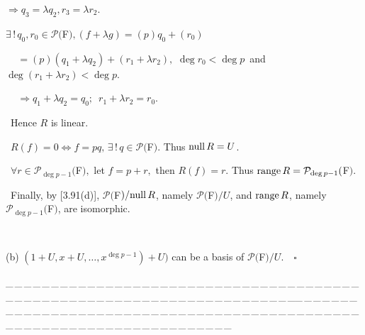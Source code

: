 \documentclass[a4paper, 11pt, UTF8]{article}
\def\range{\textup{range}\,}
\def\null{\textup{null\,}}
\def\Po{\mathcal{P}}
\begin{document}
\begin{large}
$\Rightarrow q_3=\lambda q_2,r_3=\lambda r_2.$\par\qquad\qquad\qquad\quad\quad
$\exists\,!\,q_0,r_0\in\Po(${\timesbf F}$),(f+\lambda g)=(p)q_0+(r_0)$\par\qquad\qquad\,\,\,\,\,\qquad\qquad\qquad\quad\qquad\qquad\qquad\quad\,\,$=(p)(q_1+\lambda q_2)+(r_1+\lambda r_2),\,\,\deg r_0<\deg p$ \,{\small and}\, $\deg (r_1+\lambda r_2)<\deg p.$\par\qquad\qquad\qquad\,\,\,\,\,\qquad\qquad\qquad\qquad\quad\qquad\quad\,\,$\Rightarrow q_1+\lambda q_2=q_0;\,\,\,r_1+\lambda r_2=r_0.$\par\large\qquad\,
Hence $R$ is linear.\par\qquad\,
$R(f)=0\Longleftrightarrow f=pq,\,\exists\,!\,q\in\Po(${\timesbf F}$).$ Thus $\null R=U$.\par\qquad\,
$\forall r\in\Po_{\deg p-1}(${\timesbf F}$),$ let $f=p+r,$ then $R(f)=r.$ Thus $\range R=\Po_{\deg p-1}(${\timesbf F}$)$.\par\qquad\,
Finally, by [3.91(d)], $\Po(${\timesbf F}$)/\null R$, namely $\Po(${\timesbf F}$)/U$, and $\range R$, namely $\Po_{\deg p-1}(${\timesbf F}$)$, are isomorphic.\par{\tiny\,\par}\quad
(b) $(1+U,x+U,\dots,x^{\deg p-1})+U)$ can be a basis of $\Po(${\timesbf F}$)/U.\quad\square$\par
{\tiny \_\,\_\,\_\,\_\,\_\,\_\,\_\,\_\,\_\,\_\,\_\,\_\,\_\,\_\,\_\,\_\,\_\,\_\,\_\,\_\,\_\,\_\,\_\,\_\,\_\,\_\,\_\,\_\,\_\,\_\,\_\,\_\,\_\,\_\,\_\,\_\,\_\,\_\,\_\,\_\,\_\,\_\,\_\,\_\,\_\,\_\,\_\,\_\,\_\,\_\,\_\,\_\,\_\,\_\,\_\,\_\,\_\,\_\,\_\,\_\,\_\,\_\,\_\,\_\,\_\,\_\,\_\,\_\,\_\,\_\,\_\_\,\_\,\_\,\_\,\_\,\_\,\_\,\_\,\_\,\_\,\_\,\_\,\_\,\_\,\_\,\_\,\_\,\_\,\_\,\_\,\_\,\_\,\_\,\_\,\_\,\_\,\_\,\_\,\_\,\_\,\_\,\_\,\_\,\_\,\_\,\_\,\_\,\_\,\_\,\_\,\_\,\_\,\_\,\_\,\_\,\_\,\_\,\_\,\_\,\_\,\_\,\_\,\_\,\_\,\_\,\_\,\_\,\_\,\_\,\_\,\_\,\_\,\_\,\_\,\_\,\_\,\_\,\_\,\_\,\_\,\_}{\tiny\,\par}


\end{large}
\end{document}
